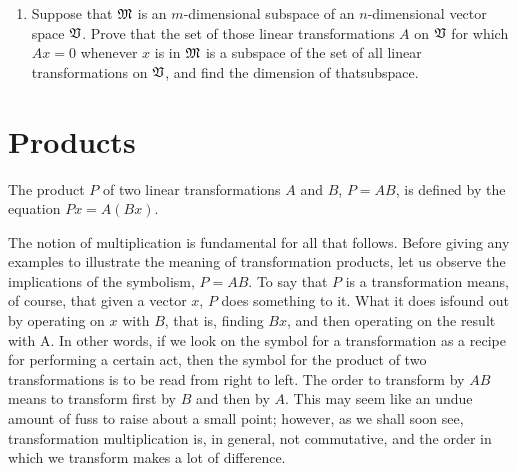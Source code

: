 {\begin{enumerate}[label=(\arabic*), wide]
\begin{enumerate}[label=(\alph*), wide, nosep]
        from \(\frak{U}\) to \(\VecSp\).
        \item If we write, by definition, \(C = \alpha A + \beta B\), then the
        set of all linear transformations from \(\frak{U}\) to \(\VecSp\)
        becomes a vector space with respect to this definition of the linear
        operations.
        \item Prove that if \(\frak{U}\) and \(\VecSp\) are finite-dimensional,
        then so is the space of all linear transformationsfrom \(\frak{U}\) to
        \(\VecSp\), and find its dimension.
    \end{enumerate}
    \item Suppose that \(\frak{M}\) is an \(m\)-dimensional subspace of an
    \(n\)-dimensional vector space \(\VecSp\). Prove that the set of those
    linear transformations \(A\) on \(\VecSp\) for which \(Ax = 0\) whenever
    \(x\) is in \(\frak{M}\) is a subspace of the set of all linear
    transformations on \(\VecSp\), and find the dimension of thatsubspace.
\end{enumerate}

}

\section{Products}

The product \(P\) of two linear transformations \(A\) and \(B\), \(P = AB\), is
defined by the equation \(P x = A(Bx)\).

The notion of multiplication is fundamental for all that follows. Before giving
any examples to illustrate the meaning of transformation products, let us
observe the implications of the symbolism, \(P = AB\). To say that \(P\) is a
transformation means, of course, that given a vector \(x\), \(P\) does something
to it. What it does isfound out by operating on \(x\) with \(B\), that is,
finding \(Bx\), and then operating on the result with A. In other words, if we
look on the symbol for a transformation as a recipe for performing a certain
act, then the symbol for the product of two transformations is to be read from
right to left. The order to transform by \(AB\) means to transform first by
\(B\) and then by \(A\). This may seem like an undue amount of fuss to raise
about a small point; however, as we shall soon see, transformation
multiplication is, in general, not commutative, and the order in which we
transform makes a lot of difference.

